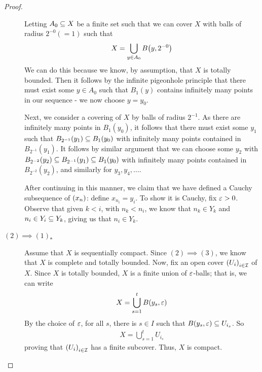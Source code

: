 \begin{proof}
\begin{description}
        Letting $A_0 \subseteq X$ be a finite set such that we can cover $X$ with balls of radius $2^{-0}(=1)$ such that
        \begin{align*}
            X = \bigcup_{y \in A_0} B\of{y, 2^{-0}} %
        \end{align*}
        We can do this because we know, by assumption, that $X$ is totally bounded. Then it follows by the infinite pigeonhole principle that there must exist some $y\in A_0$ such that $B_1(y)$ contains infinitely many points in our sequence - we now choose $y=y_0$.

        Next, we consider a covering of $X$ by balls of radius $2^{-1}$. As there are infinitely many points in $B_1(y_0)$, it follows that there must exist some $y_1$ such that $B_{2^{-1}}(y_1)\subseteq B_1(y_0)$ with infinitely many points contained in $B_{2^{-1}}(y_1)$. It follows by similar argument that we can choose some $y_2$ with $B_{2^{-2}}(y_2)\subseteq B_{2^{-1}}(y_1)\subseteq B_1(y_0)$ with infinitely many points contained in $B_{2^{-2}}(y_2)$, and similarly for $y_3, y_4, \ldots$.

        After continuing in this manner, we claim that we have defined a Cauchy subsequence of $\left( x_n \right)$: define $x_{n_i} = y_i$. To show it is Cauchy, fix $\varepsilon > 0$. Observe that given $k < i$, with $n_k < n_i$, we know that $n_k \in Y_k$ and $n_i \in Y_i \subseteq Y_k$, giving us that $n_i \in Y_k$. \sorry

        \item[\underline{$(2) \implies (1)$.}] Assume that $X$ is sequentially compact. Since $(2) \implies (3)$, we know that $X$ is complete and totally bounded. Now, fix an open cover $\left( U_i \right)_{i \in \mathcal{I}}$ of $X$. Since $X$ is totally bounded, $X$ is a finite union of $\varepsilon$-balls; that is, we can write
        \begin{align*}
            X = \bigcup_{s=1}^{t} B\!\left( y_s, \varepsilon \right)
        \end{align*}
        By the choice of $\varepsilon$, %
        for all $s$, there is $s \in I$ such that $B\!\left( y_s, \varepsilon \right) \subseteq U_{i_s}$. So
        \begin{align*}
            X = \bigcup_{s=1}^{t} U_{i_s}
        \end{align*}
        proving that $\left( U_i \right)_{i \in \mathcal{I}}$ has a finite subcover. Thus, $X$ is compact.
    \end{description}
\end{proof}%
